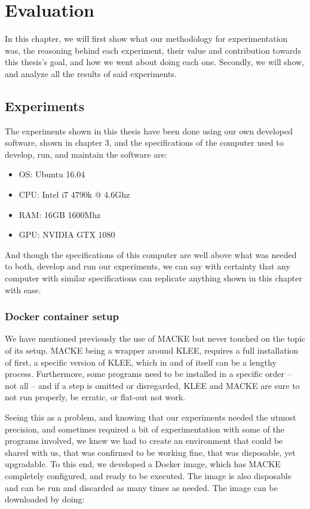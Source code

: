 
\chapter{Evaluation}\label{chapter:Evaluation}

In this chapter, we will first show what our methodology for experimentation was, the reasoning behind each experiment, their value and contribution towards this thesis's goal, and how we went about doing each one. Secondly, we will show, and analyze all the results of said experiments.

\section{Experiments}

The experiments shown in this thesis have been done using our own developed software, shown in chapter 3, and the specifications of the computer used to develop, run, and maintain the software are:

\begin{itemize}
	\item OS: Ubuntu 16.04
	\item CPU: Intel i7 4790k @ 4.6Ghz
	\item RAM: 16GB 1600Mhz
	\item GPU: NVIDIA GTX 1080
\end{itemize}

And though the specifications of this computer are well above what was needed to both, develop and run our experiments, we can say with certainty that any computer with similar specifications can replicate anything shown in this chapter with ease.

\subsection{Docker container setup}

We have mentioned previously the use of MACKE but never touched on the topic of its setup. MACKE being a wrapper around KLEE, requires a full installation of first, a specific version of KLEE, which in and of itself can be a lengthy process. Furthermore, some programs need to be installed in a specific order -- not all -- and if a step is omitted or disregarded, KLEE and MACKE are sure to not run properly, be erratic, or flat-out not work.

Seeing this as a problem, and knowing that our experiments needed the utmost precision, and sometimes required a bit of experimentation with some of the programs involved, we knew we had to create an environment that could be shared with us, that was confirmed to be working fine, that was disposable, yet upgradable. To this end, we developed a Docker \parencite{docker} image, which has MACKE completely configured, and ready to be executed. The image is also disposable and can be run and discarded as many times as needed. The image can be downloaded by doing:

